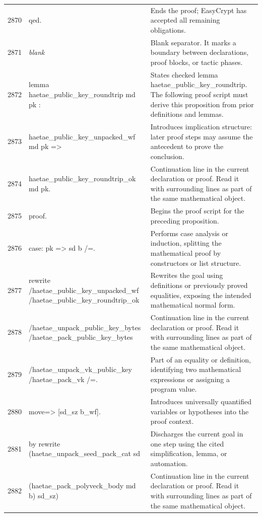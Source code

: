 \documentclass[10pt]{article}
\begin{document}
\begin{longtable}{r L{0.53\textwidth} L{0.37\textwidth}}
2870 & {\ttfamily\scriptsize qed.} & Ends the proof; EasyCrypt has accepted all remaining obligations. \\
2871 & {\ttfamily\scriptsize \emph{blank}} & Blank separator.  It marks a boundary between declarations, proof blocks, or tactic phases. \\
2872 & {\ttfamily\scriptsize lemma haetae\_public\_key\_roundtrip md pk :} & States checked lemma haetae\_public\_key\_roundtrip.  The following proof script must derive this proposition from prior definitions and lemmas. \\
2873 & {\ttfamily\scriptsize   haetae\_public\_key\_unpacked\_wf md pk =>} & Introduces implication structure: later proof steps may assume the antecedent to prove the conclusion. \\
2874 & {\ttfamily\scriptsize   haetae\_public\_key\_roundtrip\_ok md pk.} & Continuation line in the current declaration or proof.  Read it with surrounding lines as part of the same mathematical object. \\
2875 & {\ttfamily\scriptsize proof.} & Begins the proof script for the preceding proposition. \\
2876 & {\ttfamily\scriptsize case: pk => sd b /=.} & Performs case analysis or induction, splitting the mathematical proof by constructors or list structure. \\
2877 & {\ttfamily\scriptsize rewrite /haetae\_public\_key\_unpacked\_wf /haetae\_public\_key\_roundtrip\_ok} & Rewrites the goal using definitions or previously proved equalities, exposing the intended mathematical normal form. \\
2878 & {\ttfamily\scriptsize         /haetae\_unpack\_public\_key\_bytes /haetae\_pack\_public\_key\_bytes} & Continuation line in the current declaration or proof.  Read it with surrounding lines as part of the same mathematical object. \\
2879 & {\ttfamily\scriptsize         /haetae\_unpack\_vk\_public\_key /haetae\_pack\_vk /=.} & Part of an equality or definition, identifying two mathematical expressions or assigning a program value. \\
2880 & {\ttfamily\scriptsize move=> [sd\_sz b\_wf].} & Introduces universally quantified variables or hypotheses into the proof context. \\
2881 & {\ttfamily\scriptsize by rewrite (haetae\_unpack\_seed\_pack\_cat sd} & Discharges the current goal in one step using the cited simplification, lemma, or automation. \\
2882 & {\ttfamily\scriptsize              (haetae\_pack\_polyveck\_body md b) sd\_sz)} & Continuation line in the current declaration or proof.  Read it with surrounding lines as part of the same mathematical object. \\

\end{longtable}
\end{document}
